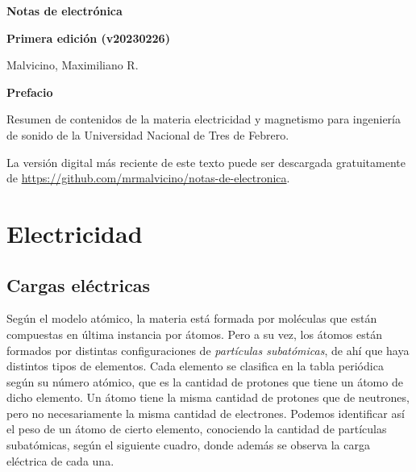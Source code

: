 \documentclass[a5paper,12pt,twoside]{book}
\begin{document}
\pagestyle{fancy}
\fancyhf{}
\chead{\scriptsize \nouppercase\rightmark}
\cfoot{\scriptsize \thepage}
\renewcommand{\headrulewidth}{0pt}

\frontmatter
% 

\begin{center}
    \begin{Huge}
        \textbf{Notas de electrónica}
    \end{Huge}

    \vspace{1cm}
    \textbf{Primera edición (v20230226)}
    \vspace{2cm}

    \begin{Large}
        Malvicino, Maximiliano R.
    \end{Large}
\end{center}

\clearpage
\noindent
\textbf{Prefacio}

Resumen de contenidos de la materia electricidad y magnetismo para ingeniería de sonido de la Universidad Nacional de Tres de Febrero.

La versión digital más reciente de este texto puede ser descargada gratuitamente de \url{https://github.com/mrmalvicino/notas-de-electronica}.

\renewcommand{\spanishappendixname}{Anexo}
\tableofcontents

\mainmatter
{}


\chapter{Electricidad}


\section{Cargas eléctricas}

Según el modelo atómico, la materia está formada por moléculas que están compuestas en última instancia por átomos. Pero a su vez, los átomos están formados por distintas configuraciones de \emph{partículas subatómicas}, de ahí que haya distintos tipos de elementos. Cada elemento se clasifica en la tabla periódica según su número atómico, que es la cantidad de protones que tiene un átomo de dicho elemento. Un átomo tiene la misma cantidad de protones que de neutrones, pero no necesariamente la misma cantidad de electrones. Podemos identificar así el peso de un átomo de cierto elemento, conociendo la cantidad de partículas subatómicas, según el siguiente cuadro, donde además se observa la carga eléctrica de cada una.
\end{document}
